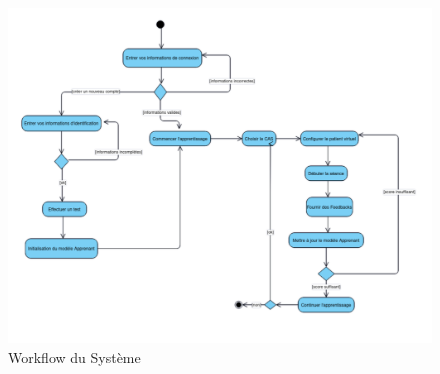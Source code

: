 \begin{figure}[H]
        \centering
        \hspace*{-0.6in}
        \includegraphics[width=1.2\textwidth]{figures/worflow_STI.png}
        \captionsetup{justification=centering}
        \caption{Workflow du Système}
        \label{fig:workflow}
\end{figure}



